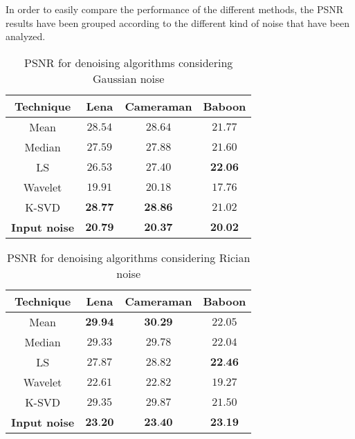 In order to easily compare the performance of the different methods, the PSNR results have been grouped according to the different kind of noise that have been analyzed.

\begin{table}[H]
	\centering
	\caption{PSNR for denoising algorithms considering Gaussian noise}
	\begin{tabular}{|c|c|c|c|}
	\hline
	\textbf{Technique} & \textbf{Lena} & \textbf{Cameraman} & \textbf{Baboon} \\ \hline
	Mean & $28.54$ & $28.64$ & $21.77$ \\ \hline
	Median & $27.59$ & $27.88$ & $21.60$ \\ \hline
	LS & $26.53$ & $27.40$ & $\textbf{22.06}$ \\ \hline
	Wavelet & $19.91$ & $20.18$& $17.76$\\ \hline
	K-SVD & $\textbf{28.77}$ & $\textbf{28.86}$ & $21.02$ \\ \hline
	\textbf{Input noise} & $\textbf{20.79}$ & $\textbf{20.37}$ & $\textbf{20.02}$ \\ \hline
	\end{tabular}
	\label{tab:numerical_results_gaussian}
\end{table}

\begin{table}[H]
	\centering
	\caption{PSNR for denoising algorithms considering Rician noise}
	\begin{tabular}{|c|c|c|c|}
	\hline
	\textbf{Technique} & \textbf{Lena} & \textbf{Cameraman} & \textbf{Baboon} \\ \hline
	Mean & $\textbf{29.94}$ & $\textbf{30.29}$ & $22.05$ \\ \hline
	Median & $29.33$ & $29.78$ & $22.04$ \\ \hline
	LS & $27.87$ & $28.82$ & $\textbf{22.46}$ \\ \hline
	Wavelet & $22.61$ & $22.82$ & $19.27$ \\ \hline
	K-SVD & $29.35$  & $29.87$ & $21.50$ \\ \hline
	\textbf{Input noise} & $\textbf{23.20}$ & $\textbf{23.40}$ & $\textbf{23.19}$ \\ \hline
	\end{tabular}
	\label{tab:numerical_results_rician}
\end{table}

